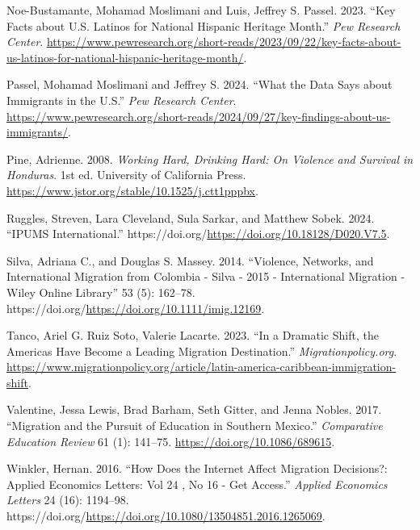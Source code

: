 \documentclass[
]{article}
\newlength{\cslhangindent}
\newenvironment{CSLReferences}[2] %
 {\begin{list}{}{%
  \setlength{\itemindent}{0pt}
  \setlength{\leftmargin}{0pt}
  \setlength{\parsep}{0pt}
  \ifodd #1
   \setlength{\leftmargin}{\cslhangindent}
   \setlength{\itemindent}{-1\cslhangindent}
  \fi
  \setlength{\itemsep}{#2\baselineskip}}}
 {\end{list}}
\begin{document}
\begin{CSLReferences}{1}{0}
Noe-Bustamante, Mohamad Moslimani and Luis, Jeffrey S. Passel. 2023.
{``Key Facts about {U}.{S}. {Latinos} for {National} {Hispanic}
{Heritage} {Month}.''} \emph{Pew Research Center}.
\url{https://www.pewresearch.org/short-reads/2023/09/22/key-facts-about-us-latinos-for-national-hispanic-heritage-month/}.

Passel, Mohamad Moslimani and Jeffrey S. 2024. {``What the Data Says
about Immigrants in the {U}.{S}.''} \emph{Pew Research Center}.
\url{https://www.pewresearch.org/short-reads/2024/09/27/key-findings-about-us-immigrants/}.

Pine, Adrienne. 2008. \emph{Working {Hard}, {Drinking} {Hard}: {On}
{Violence} and {Survival} in {Honduras}}. 1st ed. University of
California Press.
\url{https://www.jstor.org/stable/10.1525/j.ctt1pppbx}.

Ruggles, Streven, Lara Cleveland, Sula Sarkar, and Matthew Sobek. 2024.
{``{IPUMS} {International}.''}
https://doi.org/\url{https://doi.org/10.18128/D020.V7.5}.

Silva, Adriana C., and Douglas S. Massey. 2014. {``Violence, {Networks},
and {International} {Migration} from {Colombia} - {Silva} - 2015 -
{International} {Migration} - {Wiley} {Online} {Library}''} 53 (5):
162--78. https://doi.org/\url{https://doi.org/10.1111/imig.12169}.

Tanco, Ariel G. Ruiz Soto, Valerie Lacarte. 2023. {``In a {Dramatic}
{Shift}, the {Americas} {Have} {Become} a {Leading} {Migration}
{Destination}.''} \emph{Migrationpolicy.org}.
\url{https://www.migrationpolicy.org/article/latin-america-caribbean-immigration-shift}.

Valentine, Jessa Lewis, Brad Barham, Seth Gitter, and Jenna Nobles.
2017. {``Migration and the {Pursuit} of {Education} in {Southern}
{Mexico}.''} \emph{Comparative Education Review} 61 (1): 141--75.
\url{https://doi.org/10.1086/689615}.

Winkler, Hernan. 2016. {``How Does the Internet Affect Migration
Decisions?: {Applied} {Economics} {Letters}: {Vol} 24 , {No} 16 - {Get}
{Access}.''} \emph{Applied Economics Letters} 24 (16): 1194--98.
https://doi.org/\url{https://doi.org/10.1080/13504851.2016.1265069}.

\end{CSLReferences}
\end{document}
